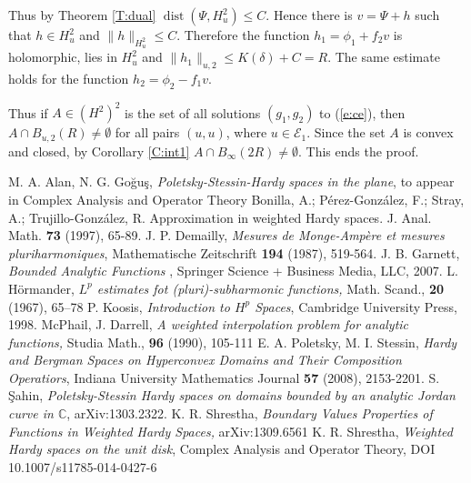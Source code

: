 \documentclass{amsart}
\theoremstyle{remark}
\begin{document}
Thus by Theorem \ref{T:dual} ${\operatorname{dist}}(\Psi,H^2_u)\le C$.
Hence there is $v=\Psi+h$ such that $h\in H^2_u$ and $\|h\|_{H^2_u}\le C$. Therefore the function $h_1=\phi_1+f_2v$ is holomorphic, lies in $H^2_u$ and $\|h_1\|_{u,2}\le K({\delta})+C=R$. The same estimate holds for the function $h_2=\phi_2-f_1v$.
\par Thus if $A\in (H^2)^2$ is the set of all solutions $(g_1,g_2)$ to (\ref{e:ce}), then $A\cap B_{u,2}(R)\ne\emptyset$ for all pairs $(u,u)$, where $u\in{{\mathcal E}}_1$. Since the set $A$ is convex and closed, by Corollary \ref{C:int1} $A\cap B_\infty(2R)\ne\emptyset$. This ends the proof.
\begin{thebibliography}{9}
 M. A. Alan, N. G. Go\u{g}u\c{s}, \emph{ Poletsky-Stessin-Hardy spaces in the plane}, to appear in Complex Analysis and Operator Theory
Bonilla, A.; P\'erez-Gonz\'alez, F.; Stray, A.; Trujillo-Gonz\'alez, R. Approximation in weighted Hardy spaces. J. Anal. Math. {\bf 73} (1997), 65-89.
 J. P. Demailly, \emph{ Mesures de Monge-Amp\`ere et mesures pluriharmoniques}, Mathematische Zeitschrift {\bf 194} (1987), 519-564.
 J. B. Garnett, \emph{ Bounded Analytic Functions }, Springer Science + Business Media, LLC, 2007.
 L. H\"ormander, \emph{ $L^p$ estimates fot (pluri)-subharmonic functions,} Math. Scand., {\bf 20} (1967), 65--78
 P. Koosis, \emph{ Introduction to $H^p$ Spaces}, Cambridge University Press, 1998.
 McPhail, J. Darrell, \emph{A weighted interpolation problem for analytic functions,} Studia Math., {\bf 96}  (1990), 105-111
 E. A. Poletsky, M. I. Stessin, \emph{ Hardy and Bergman Spaces on Hyperconvex Domains and Their Composition Operatiors}, Indiana University Mathematics Journal {\bf 57} (2008), 2153-2201.
 S. \c{S}ahin, \emph{Poletsky-Stessin Hardy spaces on domains bounded by an analytic Jordan curve in ${\mathbb C}$}, arXiv:1303.2322.
 K. R. Shrestha, \emph{ Boundary Values Properties of Functions in Weighted Hardy Spaces,} arXiv:1309.6561
 K. R. Shrestha, \emph{ Weighted Hardy spaces on the unit disk}, Complex Analysis and Operator Theory, DOI 10.1007/s11785-014-0427-6
\end{thebibliography}
\end{document}
